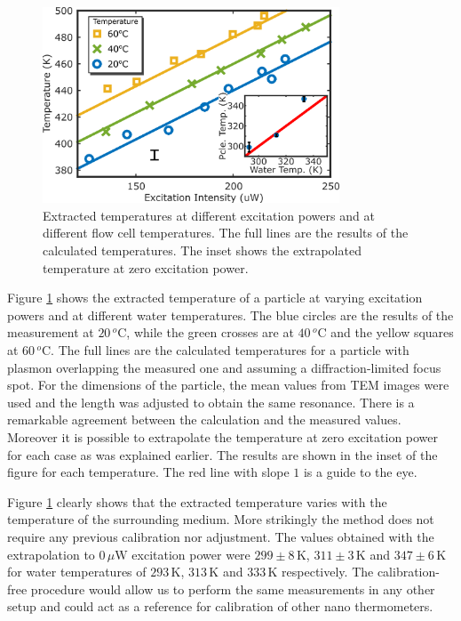 \documentclass[journal=nalefd,manuscript=letter]{achemso}
\newcommand{\K}{\ensuremath{\,\textrm{K}}}
\newcommand{\uW}{\ensuremath{\,\mu\textrm{W}}}
\newcommand{\degree}{\ensuremath{\,^o\textrm{C}}}
\begin{document}
\begin{figure}[tp] \centering
\includegraphics[width=88.4mm]{Figures/03_Fit_Of_AS/03_Log_Fit_AS_02.png}
\caption{Extracted temperatures at different excitation powers and at
different flow cell temperatures. The full lines are the results of the
calculated temperatures. The inset shows the extrapolated temperature at zero
excitation power.}
	\label{fig:AS_temp}
\end{figure}

Figure \ref{fig:AS_temp} shows the extracted temperature of a particle at
varying excitation powers and at different water temperatures. The blue circles
are the results of the measurement at $20\degree$, while the green crosses are
at $40\degree$ and the yellow squares at $60\degree$. The full lines are the
calculated temperatures for a particle with plasmon overlapping the measured one
and assuming a diffraction-limited focus spot. For the dimensions of the
particle, the mean values from TEM images were used and the length was adjusted
to obtain the same resonance. There is a remarkable agreement between the
calculation and the measured values. Moreover it is possible to extrapolate the
temperature at zero excitation power for each case as was explained earlier. The
results are shown in the inset of the figure for each temperature. The red line
with slope $1$ is a guide to the eye.

Figure \ref{fig:AS_temp} clearly shows that the extracted temperature varies
with the temperature of the surrounding medium. More strikingly the method does
not require any previous calibration nor adjustment. The values obtained with
the extrapolation to $0\uW$ excitation power were $299 \pm 8\K$, $311\pm 3\K$
and $347 \pm 6\K$ for water temperatures of $293\K$, $313\K$ and $333\K$
respectively. The calibration-free procedure would allow us to perform the same
measurements in any other setup and could act as a reference for calibration of
other nano thermometers.
\end{document}
